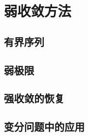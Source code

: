 \section{弱收敛方法}
\label{b1:sec:2503}


\subsection{有界序列}
\label{b1:subsec:250301}

\subsection{弱极限}
\label{b1:subsec:250302}

\subsection{强收敛的恢复}
\label{b1:subsec:250303}

\subsection{变分问题中的应用}
\label{b1:subsec:250304}


